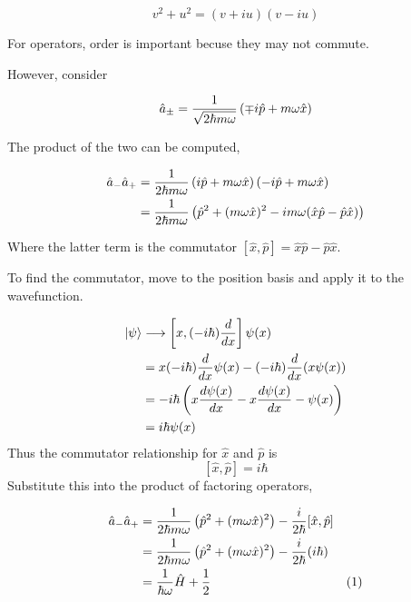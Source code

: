 \documentclass[english, 11pt]{article}
\begin{document}
      \[ v^2 + u^2 = (v+iu)(v-iu) \]

      For operators, order is important becuse they may not commute.\newline

      However, consider

      \[ \hat{a}_{\pm} = \frac{1}{\sqrt{2\hbar m \omega}} \left( \mp i \hat{p} + m\omega \hat{x} \right) \]

      The product of the two can be computed,

      \begin{align*}
        \hat{a}_-\hat{a}_+ & = \frac{1}{2\hbar m \omega} \left( i\hat{p} + m\omega \hat{x} \right)\left( -i\hat{p} + m\omega\hat{x} \right) \\
        & = \frac{1}{2\hbar m \omega} \left( \hat{p}^2 + (m\omega \hat{x})^2 - im\omega(\hat{x}\hat{p} - \hat{p}\hat{x}) \right)
      \end{align*}

      Where the latter term is the commutator $[\hat{x}, \hat{p}] = \hat{x}\hat{p}-\hat{p}\hat{x}$. \newline

      To find the commutator, move to the position basis and apply it to the wavefunction.

      \begin{align*}
         [\hat{x}, \hat{p}]\ket{\psi} & \longrightarrow \left[x, (-i\hbar)\f{d}{dx} \right]\psi(x)  \\
         & = x(-i\hbar)\f{d}{dx} \psi(x) - (-i\hbar)\f{d}{dx} (x\psi(x)) \\
         & = -i\hbar \left( x \f{d\psi(x)}{dx} - x\f{d\psi(x)}{dx} - \psi(x) \right) \\
         &  = i\hbar\psi(x)
       \end{align*}
       Thus the commutator relationship for $\hat{x}$ and $\hat{p}$ is
       \[ [\hat{x},\hat{p}] = i\hbar \]
       Substitute this into the product of factoring operators,

       \begin{align*}
         \hat{a}_-\hat{a}_+ & = \frac{1}{2\hbar m \omega} \left( \hat{p}^2 + (m\omega \hat{x})^2 \right) - \frac{i}{2\hbar}[\hat{x},\hat{p}] \\
         & = \frac{1}{2\hbar m \omega} \left( \hat{p}^2 + (m\omega\hat{x})^2 \right) - \frac{i}{2\hbar}(i\hbar) \\
         & = \frac{1}{\hbar \omega}\hat{H} + \frac{1}{2} & (1)
       \end{align*}
\end{document}

